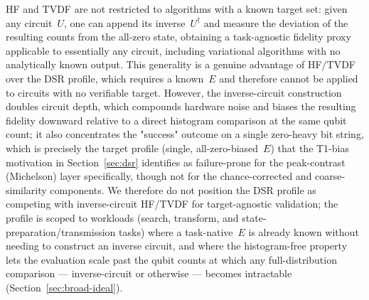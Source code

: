 HF and TVDF are not restricted to algorithms with a known target set: given any circuit~$U$, one can append its inverse~$U^\dagger$ and measure the deviation of the resulting counts from the all-zero state, obtaining a task-agnostic fidelity proxy applicable to essentially any circuit, including variational algorithms with no analytically known output. This generality is a genuine advantage of HF/TVDF over the DSR profile, which requires a known~$E$ and therefore cannot be applied to circuits with no verifiable target. However, the inverse-circuit construction doubles circuit depth, which compounds hardware noise and biases the resulting fidelity downward relative to a direct histogram comparison at the same qubit count; it also concentrates the "success" outcome on a single zero-heavy bit string, which is precisely the target profile (single, all-zero-biased~$E$) that the T1-bias motivation in Section~\ref{sec:dsr} identifies as failure-prone for the peak-contrast (Michelson) layer specifically, though not for the chance-corrected and coarse-similarity components. We therefore do not position the DSR profile as competing with inverse-circuit HF/TVDF for target-agnostic validation; the profile is scoped to workloads (search, transform, and state-preparation/transmission tasks) where a task-native~$E$ is already known without needing to construct an inverse circuit, and where the histogram-free property lets the evaluation scale past the qubit counts at which any full-distribution comparison --- inverse-circuit or otherwise --- becomes intractable (Section~\ref{sec:broad-ideal}).


%

